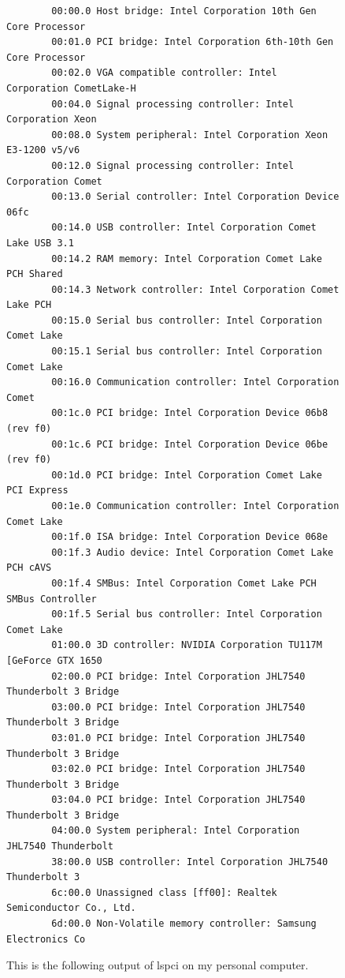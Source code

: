     \begin{figure}[hbt!]
      \centering 
      \begin{lstlisting} 
        00:00.0 Host bridge: Intel Corporation 10th Gen Core Processor 
        00:01.0 PCI bridge: Intel Corporation 6th-10th Gen Core Processor 
        00:02.0 VGA compatible controller: Intel Corporation CometLake-H 
        00:04.0 Signal processing controller: Intel Corporation Xeon 
        00:08.0 System peripheral: Intel Corporation Xeon E3-1200 v5/v6 
        00:12.0 Signal processing controller: Intel Corporation Comet 
        00:13.0 Serial controller: Intel Corporation Device 06fc
        00:14.0 USB controller: Intel Corporation Comet Lake USB 3.1 
        00:14.2 RAM memory: Intel Corporation Comet Lake PCH Shared 
        00:14.3 Network controller: Intel Corporation Comet Lake PCH
        00:15.0 Serial bus controller: Intel Corporation Comet Lake 
        00:15.1 Serial bus controller: Intel Corporation Comet Lake 
        00:16.0 Communication controller: Intel Corporation Comet 
        00:1c.0 PCI bridge: Intel Corporation Device 06b8 (rev f0)
        00:1c.6 PCI bridge: Intel Corporation Device 06be (rev f0)
        00:1d.0 PCI bridge: Intel Corporation Comet Lake PCI Express
        00:1e.0 Communication controller: Intel Corporation Comet Lake 
        00:1f.0 ISA bridge: Intel Corporation Device 068e
        00:1f.3 Audio device: Intel Corporation Comet Lake PCH cAVS
        00:1f.4 SMBus: Intel Corporation Comet Lake PCH SMBus Controller
        00:1f.5 Serial bus controller: Intel Corporation Comet Lake 
        01:00.0 3D controller: NVIDIA Corporation TU117M [GeForce GTX 1650 
        02:00.0 PCI bridge: Intel Corporation JHL7540 Thunderbolt 3 Bridge
        03:00.0 PCI bridge: Intel Corporation JHL7540 Thunderbolt 3 Bridge
        03:01.0 PCI bridge: Intel Corporation JHL7540 Thunderbolt 3 Bridge
        03:02.0 PCI bridge: Intel Corporation JHL7540 Thunderbolt 3 Bridge
        03:04.0 PCI bridge: Intel Corporation JHL7540 Thunderbolt 3 Bridge
        04:00.0 System peripheral: Intel Corporation JHL7540 Thunderbolt 
        38:00.0 USB controller: Intel Corporation JHL7540 Thunderbolt 3 
        6c:00.0 Unassigned class [ff00]: Realtek Semiconductor Co., Ltd. 
        6d:00.0 Non-Volatile memory controller: Samsung Electronics Co 
      \end{lstlisting}
      \caption{This is the following output of lspci on my personal computer. } 
      \label{fig:pci_device}
    \end{figure}

